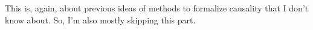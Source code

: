 This is, again, about previous ideas of methods to formalize causality that I don't know about. So, I'm also mostly skipping this part.
